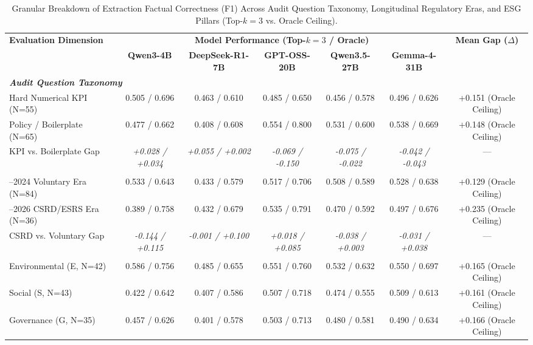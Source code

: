 \begin{table}[t]
\centering
\caption{Granular Breakdown of Extraction Factual Correctness (F1) Across Audit Question Taxonomy, Longitudinal Regulatory Eras, and ESG Pillars (Top-$k=3$ vs. Oracle Ceiling).}
\label{tab:breakdown}
\small
\begin{tabular}{lcccccc}
\toprule
\multirow{2}{*}{\textbf{Evaluation Dimension}} & \multicolumn{5}{c}{\textbf{Model Performance (Top-$k=3$ / Oracle)}} & \multirow{2}{*}{\textbf{Mean Gap ($\Delta$)}} \\
\cmidrule(lr){2-6}
 & \textbf{Qwen3-4B} & \textbf{DeepSeek-R1-7B} & \textbf{GPT-OSS-20B} & \textbf{Qwen3.5-27B} & \textbf{Gemma-4-31B} & \\
\midrule
\multicolumn{7}{l}{\textit{\textbf{Audit Question Taxonomy}}} \\
\quad Hard Numerical KPI (N=55) & 0.505 / 0.696 & 0.463 / 0.610 & 0.485 / 0.650 & 0.456 / 0.578 & 0.496 / 0.626 & +0.151 (Oracle Ceiling) \\
\quad Policy / Boilerplate (N=65) & 0.477 / 0.662 & 0.408 / 0.608 & 0.554 / 0.800 & 0.531 / 0.600 & 0.538 / 0.669 & +0.148 (Oracle Ceiling) \\
\quad KPI vs. Boilerplate Gap & \textit{+0.028 / +0.034} & \textit{+0.055 / +0.002} & \textit{-0.069 / -0.150} & \textit{-0.075 / -0.022} & \textit{-0.042 / -0.043} & --- \\
\addlinespace[3pt]
\multicolumn{7}{l}{\textit{\textbf{Longitudinal Regulatory Era}}} \\
\quad 2010--2024 Voluntary Era (N=84) & 0.533 / 0.643 & 0.433 / 0.579 & 0.517 / 0.706 & 0.508 / 0.589 & 0.528 / 0.638 & +0.129 (Oracle Ceiling) \\
\quad 2025--2026 CSRD/ESRS Era (N=36) & 0.389 / 0.758 & 0.432 / 0.679 & 0.535 / 0.791 & 0.470 / 0.592 & 0.497 / 0.676 & +0.235 (Oracle Ceiling) \\
\quad CSRD vs. Voluntary Gap & \textit{-0.144 / +0.115} & \textit{-0.001 / +0.100} & \textit{+0.018 / +0.085} & \textit{-0.038 / +0.003} & \textit{-0.031 / +0.038} & --- \\
\addlinespace[3pt]
\multicolumn{7}{l}{\textit{\textbf{ESG Pillar (Persona-Driven)}}} \\
\quad Environmental (E, N=42) & 0.586 / 0.756 & 0.485 / 0.655 & 0.551 / 0.760 & 0.532 / 0.632 & 0.550 / 0.697 & +0.165 (Oracle Ceiling) \\
\quad Social (S, N=43) & 0.422 / 0.642 & 0.407 / 0.586 & 0.507 / 0.718 & 0.474 / 0.555 & 0.509 / 0.613 & +0.161 (Oracle Ceiling) \\
\quad Governance (G, N=35) & 0.457 / 0.626 & 0.401 / 0.578 & 0.503 / 0.713 & 0.480 / 0.581 & 0.490 / 0.634 & +0.166 (Oracle Ceiling) \\
\bottomrule
\end{tabular}
\end{table}
